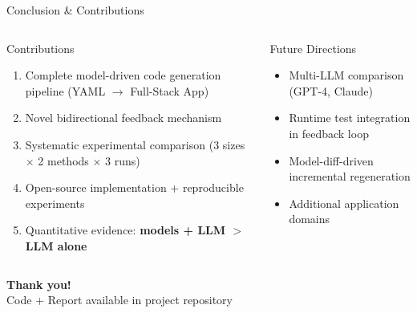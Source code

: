 \documentclass[10pt,aspectratio=169]{beamer}
\begin{document}
\begin{frame}{Conclusion \& Contributions}
\begin{columns}[T]
\begin{block}{Contributions}
\begin{enumerate}
    \item Complete model-driven code generation pipeline (YAML $\rightarrow$ Full-Stack App)
    \item Novel bidirectional feedback mechanism
    \item Systematic experimental comparison (3 sizes $\times$ 2 methods $\times$ 3 runs)
    \item Open-source implementation + reproducible experiments
    \item Quantitative evidence: \textbf{models + LLM $>$ LLM alone}
\end{enumerate}
\end{block}

\begin{block}{Future Directions}
\begin{itemize}
    \item Multi-LLM comparison (GPT-4, Claude)
    \item Runtime test integration in feedback loop
    \item Model-diff-driven incremental regeneration
    \item Additional application domains
\end{itemize}
\end{block}
\end{columns}

\vspace{6pt}
\begin{center}
\large\textbf{Thank you!}\\[4pt]
\normalsize Code + Report available in project repository
\end{center}

\end{frame}

\end{document}
